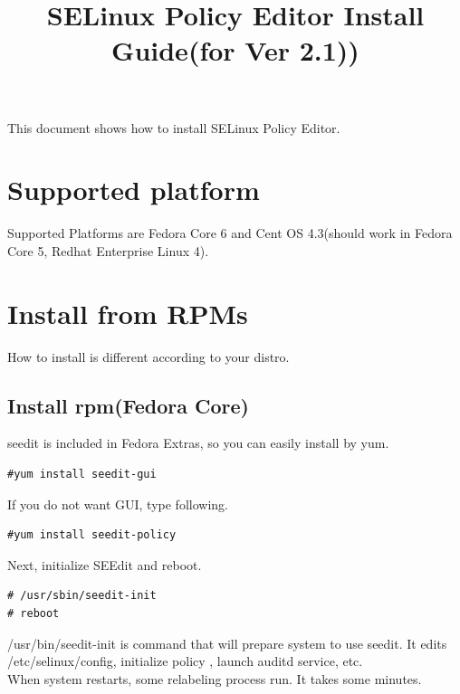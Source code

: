 \documentclass{article}
\title{SELinux Policy Editor Install Guide(for Ver 2.1))}
\begin{document}
\def\labelenumi{(\theenumi)}
\maketitle
\tableofcontents
\newpage

This document shows how to install SELinux Policy Editor.\\
\section{Supported platform}
Supported Platforms are Fedora Core 6 and Cent OS 4.3(should work in Fedora Core 5, Redhat
Enterprise Linux 4).\\
\section{Install from RPMs}
How to install is different according to your distro.

\subsection{Install rpm(Fedora Core)}\label{sec:rpm}
 seedit is included in Fedora Extras, so you can easily install by yum.
 \begin{verbatim}
#yum install seedit-gui
 \end{verbatim}
If you do not want GUI, type following.
\begin{verbatim}
#yum install seedit-policy	
\end{verbatim}
Next, initialize SEEdit and reboot.
\begin{verbatim}
# /usr/sbin/seedit-init
# reboot
\end{verbatim}
 /usr/bin/seedit-init is command that will prepare system to use seedit. It edits /etc/selinux/config, initialize policy , launch auditd service, etc.\\
When system restarts, some relabeling process run. It takes some
	  minutes. \\
\end{document}
